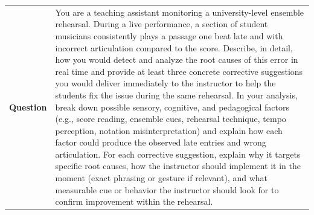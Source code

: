\begin{longtable}{@{}l p{12.5cm}@{}}
  \textbf{Question} & You are a teaching assistant monitoring a university-level ensemble rehearsal. During a live performance, a section of student musicians consistently plays a passage one beat late and with incorrect articulation compared to the score. Describe, in detail, how you would detect and analyze the root causes of this error in real time and provide at least three concrete corrective suggestions you would deliver immediately to the instructor to help the students fix the issue during the same rehearsal. In your analysis, break down possible sensory, cognitive, and pedagogical factors (e.g., score reading, ensemble cues, rehearsal technique, tempo perception, notation misinterpretation) and explain how each factor could produce the observed late entries and wrong articulation. For each corrective suggestion, explain why it targets specific root causes, how the instructor should implement it in the moment (exact phrasing or gesture if relevant), and what measurable cue or behavior the instructor should look for to confirm improvement within the rehearsal. \\

\end{longtable}
